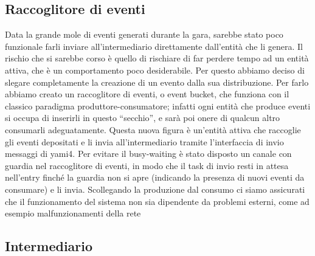 \subsection{Raccoglitore di eventi}

Data la grande mole di eventi generati durante la gara, sarebbe stato poco funzionale farli inviare all’intermediario direttamente dall’entità che li genera. Il rischio che si sarebbe corso è quello di rischiare di far perdere tempo ad un entità attiva, che è un comportamento poco desiderabile. Per questo abbiamo deciso di slegare completamente la creazione di un evento dalla sua distribuzione. Per farlo abbiamo creato un raccoglitore di eventi, o event bucket, che funziona con il classico paradigma produttore-consumatore; infatti ogni entità che produce eventi si occupa di inserirli in questo “secchio”, e sarà poi onere di qualcun altro consumarli adeguatamente.
Questa nuova figura è un’entità attiva che raccoglie gli eventi depositati e li invia all’intermediario tramite l’interfaccia di invio messaggi di yami4. Per evitare il busy-waiting è stato disposto un canale con guardia nel raccoglitore di eventi, in modo che il task di invio resti in attesa nell’entry finché la guardia non si apre (indicando la presenza di nuovi eventi da consumare) e li invia.
Scollegando la produzione dal consumo ci siamo assicurati che il funzionamento del sistema non sia dipendente da problemi esterni, come ad esempio malfunzionamenti della rete

\subsection{Intermediario}

